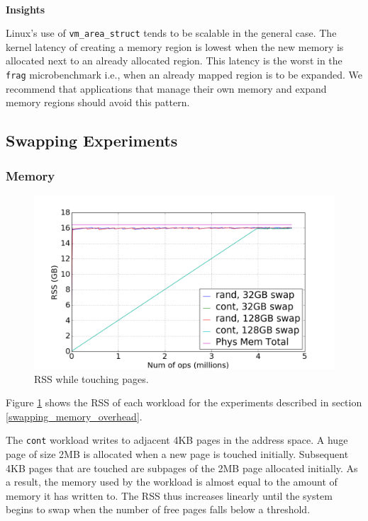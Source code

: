 \documentclass[twocolumn,11pt]{article}
\begin{document}

~\\ \textbf{Insights}

Linux's use of \texttt{vm\_area\_struct} tends to be scalable in the general
case. The kernel latency of creating a memory region is lowest when the new
memory is allocated next to an already allocated region. This latency is the
worst in the \texttt{frag} microbenchmark i.e., when an already mapped region
is to be expanded.  We recommend that applications that manage their own memory
and expand memory regions should avoid this pattern.


\subsection{Swapping Experiments}

\subsubsection{Memory}

\begin{figure}[t]
    \includegraphics[width=\columnwidth]{figures/swap_rss}
    \caption{RSS while touching pages.  \label{fig:swap_rss}}
\end{figure}

Figure \ref{fig:swap_rss} shows the RSS of each workload for the
experiments described in section \ref{swapping_memory_overhead}. 

The \texttt{cont} workload writes to adjacent 4KB pages in the address space. A huge page
of size 2MB is allocated when a new page is touched initially. Subsequent 4KB
pages that are touched are subpages of the 2MB page allocated initially. As a
result, the memory used by the workload is almost equal to the amount of memory
it has written to. The RSS thus increases linearly until the system begins to
swap when the number of free pages falls below a threshold. 
\end{document}
